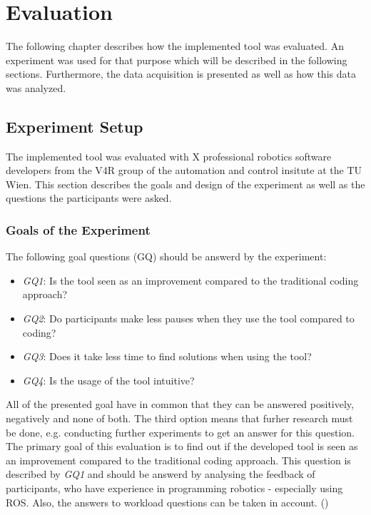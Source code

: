 \chapter{Evaluation}
The following chapter describes how the implemented tool was evaluated. An experiment was used for that purpose which will be described in the following sections. Furthermore, the data acquisition is presented as well as how this data was analyzed.

\section{Experiment Setup} \label{sec:ExperimentSetup}
The implemented tool was evaluated with X professional robotics software developers from the V4R group of the automation and control insitute at the TU Wien. This section describes the goals and design of the experiment as well as the questions the participants were asked.

\subsection{Goals of the Experiment} \label{sub:ExperimentGoals}
The following goal questions (GQ) should be answerd by the experiment:
\begin{itemize}
    \item \textit{GQ1}: Is the tool seen as an improvement compared to the traditional coding approach?
    \item \textit{GQ2}: Do participants make less pauses when they use the tool compared to coding?
    \item \textit{GQ3}: Does it take less time to find solutions when using the tool?
    \item \textit{GQ4}: Is the usage of the tool intuitive?
\end{itemize}
All of the presented goal have in common that they can be answered positively, negatively and none of both. The third option means that furher research must be done, e.g. conducting further experiments to get an answer for this question. \\

The primary goal of this evaluation is to find out if the developed tool is seen as an improvement compared to the traditional coding approach. This question is described by \textit{GQ1} and should be answerd by analysing the feedback of participants, who have experience in programming robotics - especially using ROS. Also, the answers to workload questions can be taken in account. () \\

